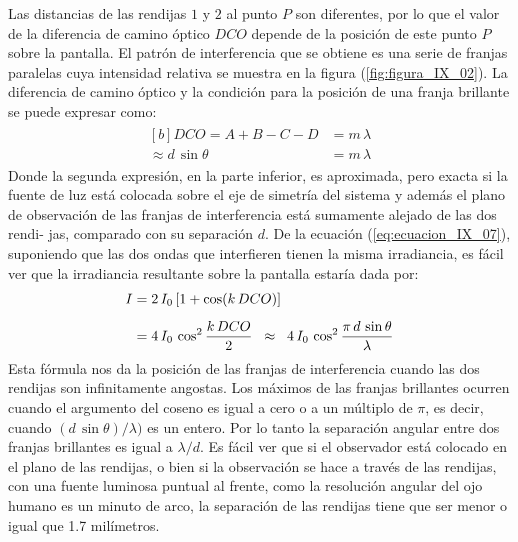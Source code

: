 \documentclass[14pt]{extarticle}
\begin{document}
Las distancias de las rendijas $1$ y $2$ al punto $P$ son diferentes, por lo que el valor de la diferencia de camino óptico $DCO$ depende de la posición de este punto $P$ sobre la pantalla. El patrón de interferencia que se obtiene es una serie de franjas paralelas cuya intensidad relativa se muestra en la figura (\ref{fig:figura_IX_02}). La diferencia de camino óptico y la condición para la posición de una franja brillante se puede expresar como:
\begin{eqnarray}
\begin{aligned}[b]
DCO = A + B - C - D &= m \, \lambda \\[0.5em]
\approx d \, \sin \theta &= m \, \lambda
\end{aligned}
\label{eq:ecuacion_IX_11}
\end{eqnarray}
Donde la segunda expresión, en la parte inferior, es aproximada, pero exacta si la fuente de luz está colocada sobre el eje de simetría del sistema y además el plano de observación de las franjas de interferencia está sumamente alejado de las dos rendi- jas, comparado con su separación $d$. De la ecuación (\ref{eq:ecuacion_IX_07}), suponiendo que las dos ondas que interfieren tienen la misma irradiancia, es fácil ver que la irradiancia resultante sobre la pantalla estaría dada por:
\begin{eqnarray}
\begin{aligned}[b]
I &= 2 \, I_{0} \left[ 1 + \cos (k \, DCO) \right] \\[0.5em]
&= 4 \, I_{0} \, \cos^{2} \dfrac{k \, DCO}{2} \hspace{0.2cm} \approx \hspace{0.2cm} 4 \, I_{0} \, \cos^{2} \dfrac{\pi \, d \, \sin \theta}{\lambda}
\end{aligned}
\label{eq:ecuacion_IX_12}
\end{eqnarray}
Esta fórmula nos da la posición de las franjas de interferencia cuando las dos rendijas son infinitamente angostas. Los máximos de las franjas brillantes ocurren cuando el argumento del coseno es igual a cero o a un múltiplo de $\pi$, es decir, cuando $(d \, \sin \theta)/ \lambda)$ es un entero. Por lo tanto la separación angular entre dos franjas brillantes es igual a $\lambda / d$. Es fácil ver que si el observador está colocado en el plano de las rendijas, o bien si la observación se hace a través de las rendijas, con una fuente luminosa puntual al frente, como la resolución angular del ojo humano es un minuto de arco, la separación de las rendijas tiene que ser menor o igual que 1.7 milímetros.
\end{document}

